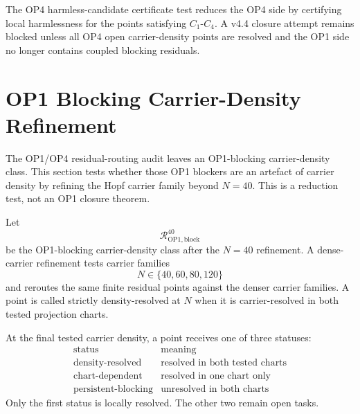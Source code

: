 \begin{theorem}
The OP4 harmless-candidate certificate test reduces the OP4 side by certifying
local harmlessness for the points satisfying \(C_1\)-\(C_4\).  A v4.4 closure
attempt remains blocked unless all OP4 open carrier-density points are resolved
and the OP1 side no longer contains coupled blocking residuals.
\end{theorem}



\section{OP1 Blocking Carrier-Density Refinement}
\label{sec:v44-op1-blocking-carrier-density-refinement}

The OP1/OP4 residual-routing audit leaves an OP1-blocking carrier-density
class.  This section tests whether those OP1 blockers are an artefact of
carrier density by refining the Hopf carrier family beyond \(N=40\).  This is
a reduction test, not an OP1 closure theorem.

\begin{definition}
Let
\[
    \mathcal R_{\mathrm{OP1,block}}^{40}
\]
be the OP1-blocking carrier-density class after the \(N=40\) refinement.  A
dense-carrier refinement tests carrier families
\[
    N\in\{40,60,80,120\}
\]
and reroutes the same finite residual points against the denser carrier
families.  A point is called strictly density-resolved at \(N\) when it is
carrier-resolved in both tested projection charts.
\end{definition}

\begin{definition}
At the final tested carrier density, a point receives one of three statuses:
\[
\begin{array}{c|l}
\text{status} & \text{meaning}\\
\hline
\mathrm{density\text{-}resolved} & \text{resolved in both tested charts}\\
\mathrm{chart\text{-}dependent} & \text{resolved in one chart only}\\
\mathrm{persistent\text{-}blocking} & \text{unresolved in both charts}
\end{array}
\]
Only the first status is locally resolved.  The other two remain open tasks.
\end{definition}

